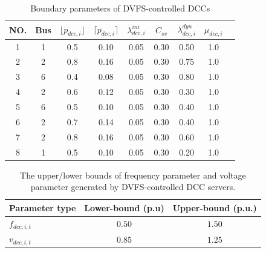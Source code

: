 \documentclass[lettersize,journal]{IEEEtran}
\begin{document}
\begin{table}[!t]
	\centering
	\caption{Boundary parameters of DVFS-controlled DCCs} \label{tab:dcc_params}
	\begin{tabular}{c | c c c c c c c c}
		\hline
		{NO.}                       &
		{Bus}                       &
		$\lfloor p_{dcc,i} \rfloor$ &
		$\lceil p_{dcc,i} \rceil$   &
		$\lambda_{dcc,i}^{ini}$     &
		$C_{sv}$                    &
		$\lambda_{dcc,i}^{dyn}$     &
		$\mu_{dcc,i}$                                                           \\
		\hline
		1                           & 1 & 0.5 & 0.10 & 0.05 & 0.30 & 0.50 & 1.0 \\
		2                           & 2 & 0.8 & 0.16 & 0.05 & 0.30 & 0.75 & 1.0 \\
		3                           & 6 & 0.4 & 0.08 & 0.05 & 0.30 & 0.80 & 1.0 \\
		4                           & 2 & 0.6 & 0.12 & 0.05 & 0.30 & 0.30 & 1.0 \\
		5                           & 6 & 0.5 & 0.10 & 0.05 & 0.30 & 0.40 & 1.0 \\
		6                           & 2 & 0.7 & 0.14 & 0.05 & 0.30 & 0.40 & 1.0 \\
		7                           & 2 & 0.8 & 0.16 & 0.05 & 0.30 & 0.60 & 1.0 \\
		8                           & 1 & 0.5 & 0.10 & 0.05 & 0.30 & 0.20 & 1.0 \\
		\hline
	\end{tabular}\vspace{-0.25cm}
\end{table}


\begin{table}[!t]
	\centering
	\caption{The upper/lower bounds of frequency parameter and voltage parameter generated by DVFS-controlled DCC servers.} \label{tab:dvfs_params}
	\begin{tabular}{l|cc}
		\hline
		Parameter type  & Lower-bound (p.u) & Upper-bound (p.u.) \\
		\hline
		\(f_{dcc,i,t}\) & $0.50$            & $1.50$             \\
		\(v_{dcc,i,t}\) & $0.85$            & $1.25$             \\
		\hline
	\end{tabular}\vspace{-0.05cm}
\end{table}
\end{document}
